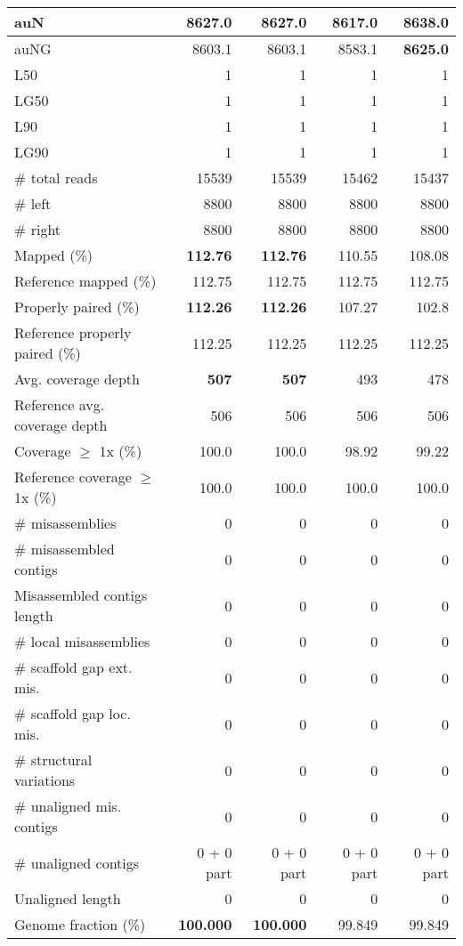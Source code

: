 \documentclass[12pt,a4paper]{article}
\begin{document}
\begin{table}[ht]
\begin{center}
\begin{tabular}{|l*{4}{|r}|}
auN & 8627.0 & 8627.0 & 8617.0 & {\bf 8638.0} \\ \hline
auNG & 8603.1 & 8603.1 & 8583.1 & {\bf 8625.0} \\ \hline
L50 & 1 & 1 & 1 & 1 \\ \hline
LG50 & 1 & 1 & 1 & 1 \\ \hline
L90 & 1 & 1 & 1 & 1 \\ \hline
LG90 & 1 & 1 & 1 & 1 \\ \hline
\# total reads & 15539 & 15539 & 15462 & 15437 \\ \hline
\# left & 8800 & 8800 & 8800 & 8800 \\ \hline
\# right & 8800 & 8800 & 8800 & 8800 \\ \hline
Mapped (\%) & {\bf 112.76} & {\bf 112.76} & 110.55 & 108.08 \\ \hline
Reference mapped (\%) & 112.75 & 112.75 & 112.75 & 112.75 \\ \hline
Properly paired (\%) & {\bf 112.26} & {\bf 112.26} & 107.27 & 102.8 \\ \hline
Reference properly paired (\%) & 112.25 & 112.25 & 112.25 & 112.25 \\ \hline
Avg. coverage depth & {\bf 507} & {\bf 507} & 493 & 478 \\ \hline
Reference avg. coverage depth & 506 & 506 & 506 & 506 \\ \hline
Coverage $\geq$ 1x (\%) & 100.0 & 100.0 & 98.92 & 99.22 \\ \hline
Reference coverage $\geq$ 1x (\%) & 100.0 & 100.0 & 100.0 & 100.0 \\ \hline
\# misassemblies & 0 & 0 & 0 & 0 \\ \hline
\# misassembled contigs & 0 & 0 & 0 & 0 \\ \hline
Misassembled contigs length & 0 & 0 & 0 & 0 \\ \hline
\# local misassemblies & 0 & 0 & 0 & 0 \\ \hline
\# scaffold gap ext. mis. & 0 & 0 & 0 & 0 \\ \hline
\# scaffold gap loc. mis. & 0 & 0 & 0 & 0 \\ \hline
\# structural variations & 0 & 0 & 0 & 0 \\ \hline
\# unaligned mis. contigs & 0 & 0 & 0 & 0 \\ \hline
\# unaligned contigs & 0 + 0 part & 0 + 0 part & 0 + 0 part & 0 + 0 part \\ \hline
Unaligned length & 0 & 0 & 0 & 0 \\ \hline
Genome fraction (\%) & {\bf 100.000} & {\bf 100.000} & 99.849 & 99.849 \\ \hline

\end{tabular}
\end{center}
\end{table}
\end{document}
